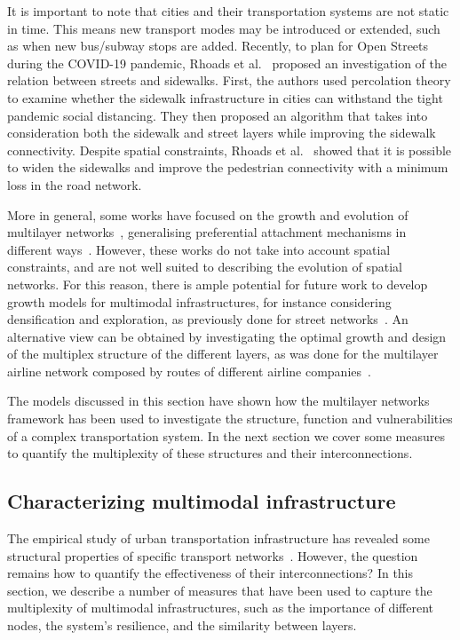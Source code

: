 It is important to note that cities and their transportation systems are not static in time. This means new transport modes may be introduced or extended, such as when new bus/subway stops are added. Recently, to plan for Open Streets during the COVID-19 pandemic, Rhoads et al.~\cite{rhoads2020planning} proposed an investigation of the relation between streets and sidewalks. First, the authors used percolation theory to examine whether the sidewalk infrastructure in cities can withstand the tight pandemic social distancing. They then proposed an algorithm that takes into consideration both the sidewalk and street layers while improving the sidewalk connectivity. Despite spatial constraints, Rhoads et al.~\cite{rhoads2020planning} showed that it is possible to widen the sidewalks and improve the pedestrian connectivity with a minimum loss in the road network. 

More in general, some works have focused on the growth and evolution of multilayer networks~\cite{nicosia2013growing,kim2013coevolution,nicosia2014nonlinear}, generalising preferential attachment mechanisms in different ways~\cite{barabasi1999emergence}. However, these works do not take into account spatial constraints, and are not well suited to describing the evolution of spatial networks. For this reason, there is ample potential for future work to develop growth models for multimodal infrastructures, for instance considering densification and exploration, as previously done for street networks~\cite{strano2012evolution}. An alternative view can be obtained by investigating the optimal growth and design of the multiplex structure of the different layers, as was done for the multilayer airline network composed by routes of different airline companies~\cite{santoro2018pareto}. 

The models discussed in this section have shown how the multilayer networks framework has been used to investigate the structure, function and vulnerabilities of a complex transportation system. In the next section we cover some measures to quantify the multiplexity of these structures and their interconnections.

\subsection{Characterizing multimodal infrastructure}\label{sec:measuresinfrastructure}

The empirical study of urban transportation infrastructure has revealed some structural properties of specific transport networks~\cite{barthelemy2011spatial}. However, the question remains how to quantify the effectiveness of their interconnections? In this section, we describe a number of measures that have been used to capture the multiplexity of multimodal infrastructures, such as the importance of different nodes, the system's resilience, and the similarity between layers.

